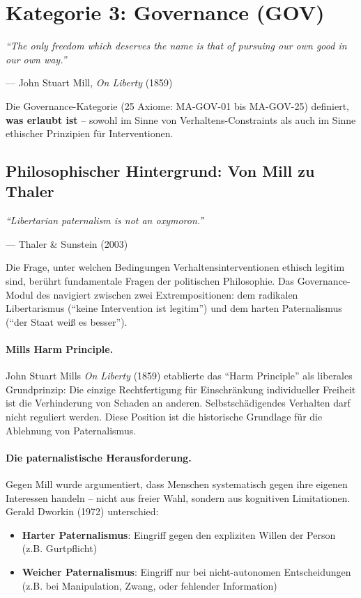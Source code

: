 \section{Kategorie 3: Governance (GOV)}

\epigraph{\textit{``The only freedom which deserves the name is that of pursuing our own good in our own way.''}}{--- John Stuart Mill, \textit{On Liberty} (1859)}

Die Governance-Kategorie (25 Axiome: MA-GOV-01 bis MA-GOV-25) definiert, \textbf{was erlaubt ist} -- sowohl im Sinne von Verhaltens-Constraints als auch im Sinne ethischer Prinzipien für Interventionen.

\subsection{Philosophischer Hintergrund: Von Mill zu Thaler}

\epigraph{\textit{``Libertarian paternalism is not an oxymoron.''}}{--- Thaler \& Sunstein (2003)}

Die Frage, unter welchen Bedingungen Verhaltensinterventionen ethisch legitim sind, berührt fundamentale Fragen der politischen Philosophie. Das Governance-Modul des \META{} navigiert zwischen zwei Extrempositionen: dem radikalen Libertarismus (``keine Intervention ist legitim'') und dem harten Paternalismus (``der Staat weiß es besser'').

\paragraph{Mills Harm Principle.}
John Stuart Mills \textit{On Liberty} (1859) etablierte das ``Harm Principle'' als liberales Grundprinzip: Die einzige Rechtfertigung für Einschränkung individueller Freiheit ist die Verhinderung von Schaden an anderen. Selbstschädigendes Verhalten darf nicht reguliert werden. Diese Position ist die historische Grundlage für die Ablehnung von Paternalismus.

\paragraph{Die paternalistische Herausforderung.}
Gegen Mill wurde argumentiert, dass Menschen systematisch gegen ihre eigenen Interessen handeln -- nicht aus freier Wahl, sondern aus kognitiven Limitationen. Gerald Dworkin (1972) unterschied:
\begin{itemize}
    \item \textbf{Harter Paternalismus}: Eingriff gegen den expliziten Willen der Person (z.B. Gurtpflicht)
    \item \textbf{Weicher Paternalismus}: Eingriff nur bei nicht-autonomen Entscheidungen (z.B. bei Manipulation, Zwang, oder fehlender Information)
\end{itemize}

